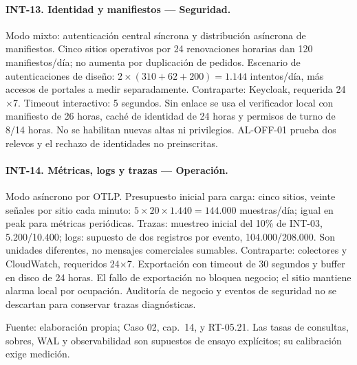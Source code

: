 \paragraph{INT-13. Identidad y manifiestos --- Seguridad.}
Modo mixto: autenticación central síncrona y distribución asíncrona de manifiestos. Cinco sitios operativos por 24 renovaciones horarias dan 120 manifiestos/día; no aumenta por duplicación de pedidos. Escenario de autenticaciones de diseño: $2\times(310+62+200)=1.144$ intentos/día, más accesos de portales a medir separadamente. Contraparte: Keycloak, requerida 24$\times$7. Timeout interactivo: 5 segundos. Sin enlace se usa el verificador local con manifiesto de 26 horas, caché de identidad de 24 horas y permisos de turno de 8/14 horas. No se habilitan nuevas altas ni privilegios. AL-OFF-01 prueba dos relevos y el rechazo de identidades no preinscritas.

\paragraph{INT-14. Métricas, logs y trazas --- Operación.}
Modo asíncrono por OTLP. Presupuesto inicial para carga: cinco sitios, veinte señales por sitio cada minuto: $5\times20\times1.440=144.000$ muestras/día; igual en peak para métricas periódicas. Trazas: muestreo inicial del 10\% de INT-03, 5.200/10.400; logs: supuesto de dos registros por evento, 104.000/208.000. Son unidades diferentes, no mensajes comerciales sumables. Contraparte: colectores y CloudWatch, requeridos 24$\times$7. Exportación con timeout de 30 segundos y buffer en disco de 24 horas. El fallo de exportación no bloquea negocio; el sitio mantiene alarma local por ocupación. Auditoría de negocio y eventos de seguridad no se descartan para conservar trazas diagnósticas.

{\footnotesize Fuente: elaboración propia; Caso 02, cap.~14, y RT-05.21. Las tasas de consultas, sobres, WAL y observabilidad son supuestos de ensayo explícitos; su calibración exige medición.\par}
